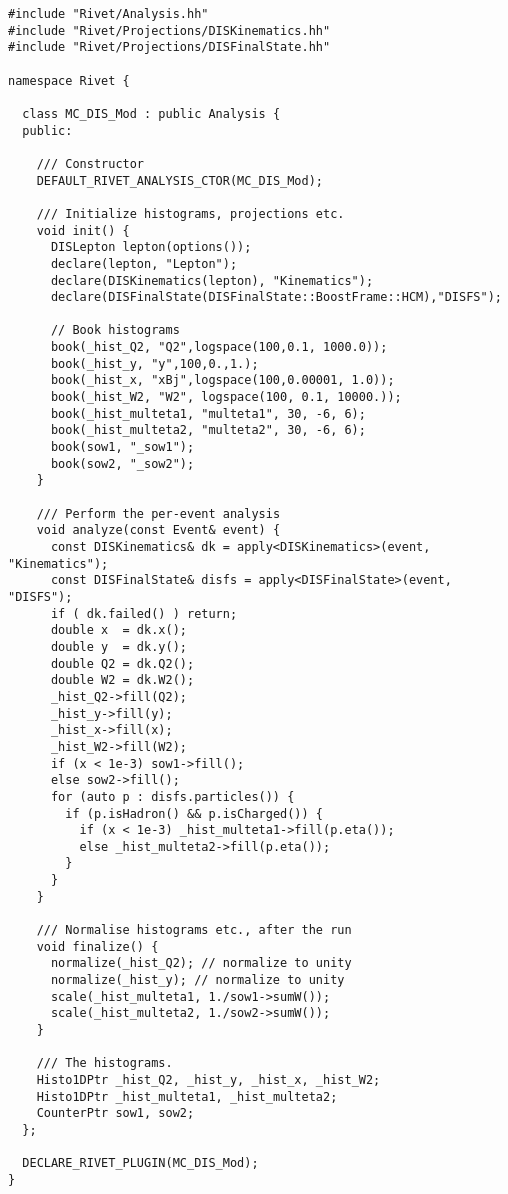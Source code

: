 \documentclass[11pt]{article}
\begin{document}
\begin{verbatim}
#include "Rivet/Analysis.hh"
#include "Rivet/Projections/DISKinematics.hh"
#include "Rivet/Projections/DISFinalState.hh"

namespace Rivet {

  class MC_DIS_Mod : public Analysis {
  public:

    /// Constructor
    DEFAULT_RIVET_ANALYSIS_CTOR(MC_DIS_Mod);
    
    /// Initialize histograms, projections etc.
    void init() {
      DISLepton lepton(options());
      declare(lepton, "Lepton");
      declare(DISKinematics(lepton), "Kinematics");
      declare(DISFinalState(DISFinalState::BoostFrame::HCM),"DISFS");

      // Book histograms
      book(_hist_Q2, "Q2",logspace(100,0.1, 1000.0));
      book(_hist_y, "y",100,0.,1.);
      book(_hist_x, "xBj",logspace(100,0.00001, 1.0));
      book(_hist_W2, "W2", logspace(100, 0.1, 10000.));
      book(_hist_multeta1, "multeta1", 30, -6, 6);      
      book(_hist_multeta2, "multeta2", 30, -6, 6);
      book(sow1, "_sow1");      
      book(sow2, "_sow2");      
    }

    /// Perform the per-event analysis
    void analyze(const Event& event) {
      const DISKinematics& dk = apply<DISKinematics>(event, "Kinematics");
      const DISFinalState& disfs = apply<DISFinalState>(event, "DISFS");
      if ( dk.failed() ) return;
      double x  = dk.x();
      double y  = dk.y();
      double Q2 = dk.Q2();
      double W2 = dk.W2();
      _hist_Q2->fill(Q2);
      _hist_y->fill(y);
      _hist_x->fill(x);
      _hist_W2->fill(W2);
      if (x < 1e-3) sow1->fill();
      else sow2->fill();
      for (auto p : disfs.particles()) {
        if (p.isHadron() && p.isCharged()) {
          if (x < 1e-3) _hist_multeta1->fill(p.eta());
          else _hist_multeta2->fill(p.eta());
        }
      }
    }

    /// Normalise histograms etc., after the run
    void finalize() {
      normalize(_hist_Q2); // normalize to unity
      normalize(_hist_y); // normalize to unity
      scale(_hist_multeta1, 1./sow1->sumW());
      scale(_hist_multeta2, 1./sow2->sumW());
    }

    /// The histograms.
    Histo1DPtr _hist_Q2, _hist_y, _hist_x, _hist_W2;
    Histo1DPtr _hist_multeta1, _hist_multeta2;
    CounterPtr sow1, sow2;
  };

  DECLARE_RIVET_PLUGIN(MC_DIS_Mod);
}
\end{verbatim}
\end{document}
